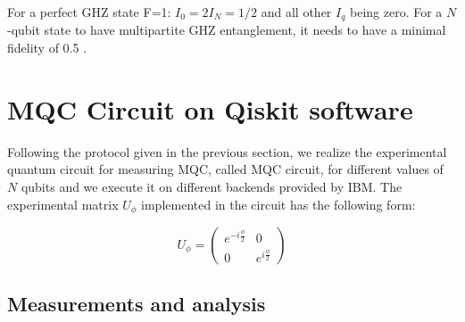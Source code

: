 \noindent For a perfect GHZ state F=1: $I_0=2 I_N=1/2$ and all other $I_q$ being zero. 
For a $N$-qubit state to have multipartite GHZ entanglement, it needs to have a minimal fidelity of 0.5 \cite{Fidelity}. 

%
%
% 

\section{MQC Circuit on Qiskit software}
\label{Qiskitsection}

Following the protocol given in the previous section, we realize the experimental quantum circuit for measuring MQC, called MQC circuit, for different values of $N$ qubits and we execute it on different backends provided by IBM. 
The experimental matrix $U_{\phi}$ implemented in the circuit has the following form: 

\begin{equation}
U_{\phi} =  \begin{pmatrix} e^{- i \frac{\phi}{2} } & 0 \\ 0 & e^{ i \frac{\phi}{2} } \end{pmatrix}  
\label{U_gate_MQC}
\end{equation}

\subsection{Measurements and analysis}
\label{analysis}

